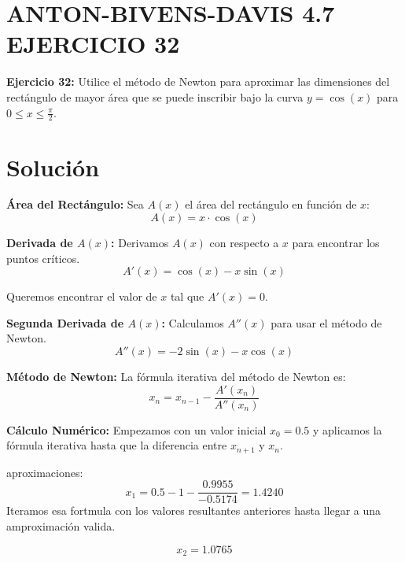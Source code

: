 
\section*{ANTON-BIVENS-DAVIS 4.7 EJERCICIO 32}

\textbf{Ejercicio 32:} Utilice el método de Newton para aproximar las dimensiones del rectángulo de mayor área que se puede inscribir bajo la curva \( y = \cos(x) \) para \( 0 \leq x \leq \frac{\pi}{2} \).

\section*{Solución}

\textbf{Área del Rectángulo:} Sea \( A(x) \) el área del rectángulo en función de \( x \):
   \begin{equation}
       A(x) = x \cdot \cos(x)
   \end{equation}

\textbf{Derivada de \( A(x) \):} Derivamos \( A(x) \) con respecto a \( x \) para encontrar los puntos críticos.
   \begin{equation}
       A'(x) = \cos(x) - x \sin(x)
   \end{equation}

   Queremos encontrar el valor de \( x \) tal que \( A'(x) = 0 \).

 \textbf{Segunda Derivada de \( A(x) \):} Calculamos \( A''(x) \) para usar el método de Newton.
   \begin{equation}
       A''(x) = -2 \sin(x) - x \cos(x)
   \end{equation}

\textbf{Método de Newton:} La fórmula iterativa del método de Newton es:
   \begin{equation}
       x_n = x_{n-1} - \frac{A'(x_n)}{A''(x_n)}
   \end{equation}

\textbf{Cálculo Numérico:} Empezamos con un valor inicial \( x_0 = 0.5 \) y aplicamos la fórmula iterativa hasta que la diferencia entre \( x_{n+1} \) y \( x_n \).

aproximaciones: 
  \begin{equation}
       x_1 = 0.5 - 1 - \frac{0.9955}{-0.5174} = 1.4240
   \end{equation}
   Iteramos esa fortmula con los valores resultantes anteriores hasta llegar a una amproximación valida.

   \begin{equation}
       x_2 = 1.0765
   \end{equation}

